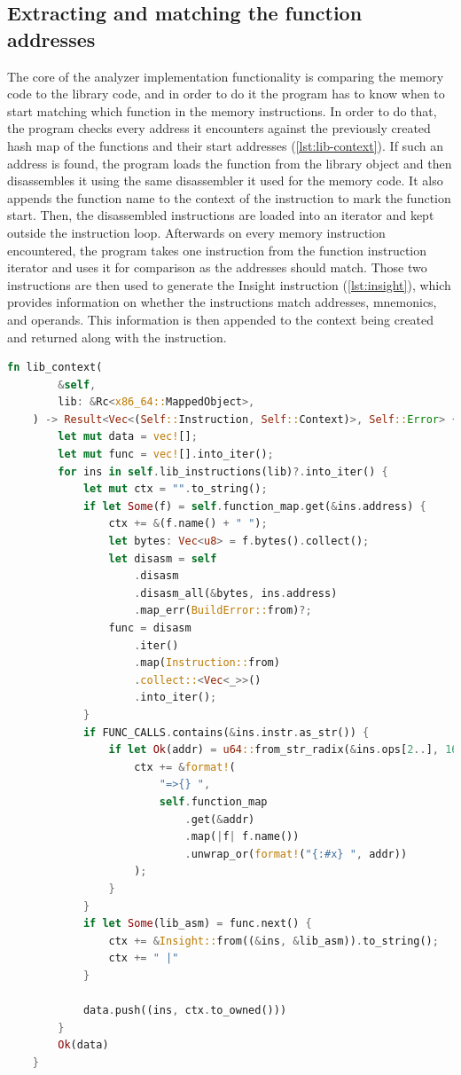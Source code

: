 \subsection{Extracting and matching the function addresses}

The core of the analyzer implementation functionality is comparing the memory code to the library code, and in order to do it the program has to know when to start matching which function in the memory instructions.
In order to do that, the program checks every address it encounters against the previously created hash map of the functions and their start addresses (\autoref{lst:lib-context}).
If such an address is found, the program loads the function from the library object and then disassembles it using the same disassembler it used for the memory code.
It also appends the function name to the context of the instruction to mark the function start.
Then, the disassembled instructions are loaded into an iterator and kept outside the instruction loop.
Afterwards on every memory instruction encountered, the program takes one instruction from the function instruction iterator and uses it for comparison as the addresses should match.
Those two instructions are then used to generate the Insight instruction (\autoref{lst:insight}), which provides information on whether the instructions match addresses, mnemonics, and operands.
This information is then appended to the context being created and returned along with the instruction.

\begin{lstlisting}[caption=\label{lst:lib-context}{Function for providing conxtextualized library instructions}, language=Rust]
    fn lib_context(
        &self,
        lib: &Rc<x86_64::MappedObject>,
    ) -> Result<Vec<(Self::Instruction, Self::Context)>, Self::Error> {
        let mut data = vec![];
        let mut func = vec![].into_iter();
        for ins in self.lib_instructions(lib)?.into_iter() {
            let mut ctx = "".to_string();
            if let Some(f) = self.function_map.get(&ins.address) {
                ctx += &(f.name() + " ");
                let bytes: Vec<u8> = f.bytes().collect();
                let disasm = self
                    .disasm
                    .disasm_all(&bytes, ins.address)
                    .map_err(BuildError::from)?;
                func = disasm
                    .iter()
                    .map(Instruction::from)
                    .collect::<Vec<_>>()
                    .into_iter();
            }
            if FUNC_CALLS.contains(&ins.instr.as_str()) {
                if let Ok(addr) = u64::from_str_radix(&ins.ops[2..], 16) {
                    ctx += &format!(
                        "=>{} ",
                        self.function_map
                            .get(&addr)
                            .map(|f| f.name())
                            .unwrap_or(format!("{:#x} ", addr))
                    );
                }
            }
            if let Some(lib_asm) = func.next() {
                ctx += &Insight::from((&ins, &lib_asm)).to_string();
                ctx += " |"
            }

            data.push((ins, ctx.to_owned()))
        }
        Ok(data)
    }
\end{lstlisting}


